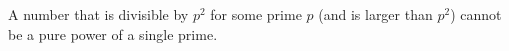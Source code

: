 A number that is divisible by $p^2$ for some prime $p$ (and is larger than $p^2$) cannot be a pure power of a single prime.